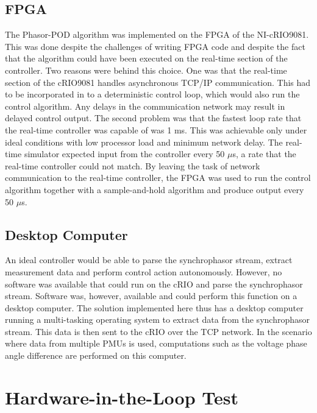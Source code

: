 \documentclass[a4paper, 10 pt, conference]{IEEEtran}
\begin{document}
\subsection{FPGA} The Phasor-POD algorithm was implemented on the FPGA of the NI-cRIO9081. This was done despite the challenges of writing FPGA code and despite the fact that the algorithm could have been executed on the real-time section of the controller. Two reasons were behind this choice. One was that the real-time section of the cRIO9081 handles asynchronous TCP/IP communication. This had to be incorporated in to a deterministic control loop, which would also run the control algorithm. Any delays in the communication network may result in delayed control output. The second problem was that the fastest loop rate that the real-time controller was capable of was 1 ms. This was achievable only under ideal conditions with low processor load and minimum network delay. The real-time simulator expected input from the controller every 50 $\mu$s, a rate that the real-time controller could not match. By leaving the task of network communication to the real-time controller, the FPGA was used to run the control algorithm together with a sample-and-hold algorithm and produce output every 50 $\mu$s.

\subsection{Desktop Computer} An ideal controller would be able to parse the synchrophasor stream, extract measurement data and perform control action autonomously. However, no software was available that could run on the cRIO and parse the synchrophasor stream. Software \cite{SDK} was, however, available and could perform this function on a desktop computer. The solution implemented here thus has a desktop computer running a multi-tasking operating system to extract data from the synchrophasor stream. This data is then sent to the cRIO over the TCP network. In the scenario where data from multiple PMUs is used, computations such as the voltage phase angle difference are performed on this computer.

\section{Hardware-in-the-Loop Test} \label{HILtest}
\end{document}
